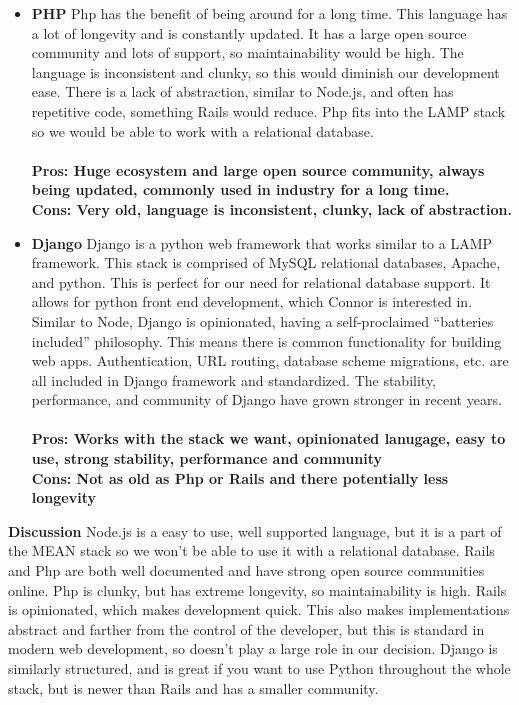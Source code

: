 \documentclass[draftclsnofoot,onecolumn,letterpaper,10pt]{IEEEtran}
\begin{document}
\begin{itemize}
				\item{\textbf{PHP}}
					Php has the benefit of being around for a long time\cite{InfoWorldPhp}.
					This language has a lot of longevity and is constantly updated. It has a large open source community and lots of support, so maintainability would be high\cite{Medium}.
					The language is inconsistent and clunky, so this would diminish our development ease.
					There is a lack of abstraction, similar to Node.js, and often has repetitive code\cite{RailsApps}, something Rails would reduce.
					Php fits into the LAMP stack so we would be able to work with a relational database.
					\\ \\
					\textbf{Pros: Huge ecosystem and large open source community, always being updated, commonly used in industry for a long time.}
					\\
					\textbf{Cons: Very old, language is inconsistent, clunky, lack of abstraction.}


				\item{\textbf{Django}}
					Django is a python web framework that works similar to a LAMP framework.
					This stack is comprised of MySQL relational databases, Apache, and python\cite{Bitnami}.
					This is perfect for our need for relational database support. It allows for python front end development, which Connor is interested in.
					Similar to Node, Django is opinionated, having a self-proclaimed “batteries included” philosophy\cite{FullStackPython}.
					This means there is common functionality for building web apps. Authentication, URL routing, database scheme migrations, etc. are all included in Django framework and standardized\cite{FullStackPython}.
					The stability, performance, and community of Django have grown stronger in recent years\cite{FullStackPython}.
					\\ \\
					\textbf{Pros: Works with the stack we want, opinionated lanugage, easy to use, strong stability, performance and community }
					\\
					\textbf{Cons: Not as old as Php or Rails and there potentially less longevity}

			\end{itemize}

		\textbf{Discussion}
			Node.js is a easy to use, well supported language, but it is a part of the MEAN stack so we won’t be able to use it with a relational database.
			Rails and Php are both well documented and have strong open source communities online.
			Php is clunky, but has extreme longevity, so maintainability is high.
			Rails is opinionated, which makes development quick.
			This also makes implementations abstract and farther from the control of the developer, but this is standard in modern web development, so doesn't play a large role in our decision.
			Django is similarly structured, and is great if you want to use Python throughout the whole stack, but is newer than Rails and has a smaller community.
\end{document}
